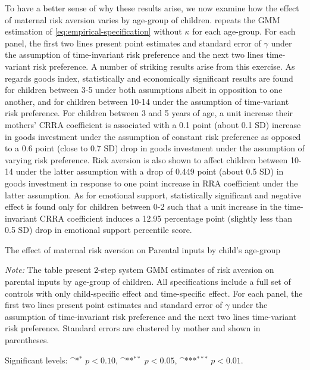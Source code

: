 \documentclass[emulatestandardclasses, 10pt, abstract = true]{scrartcl}
\begin{document}
To have a better sense of why these results arise, we now examine how the effect of maternal risk aversion varies by age-group of children.  repeats the GMM estimation of \eqref{eq:empirical-specification} without $\kappa$ for each age-group. For each panel, the first two lines present point estimates and standard error of $\gamma$ under the assumption of time-invariant risk preference and the next two lines time-variant risk preference. A number of striking results arise from this exercise. As regards goods index, statistically and economically significant results are found for children between 3-5 under both assumptions albeit in opposition to one another, and for children between 10-14 under the assumption of time-variant risk preference. For children between 3 and 5 years of age, a unit increase their mothers' CRRA coefficient is associated with a 0.1 point (about 0.1 SD) increase in goods investment under the assumption of constant risk preference as opposed to a 0.6 point (close to 0.7 SD) drop in goods investment under the assumption of varying risk preference. Risk aversion is also shown to affect children between 10-14 under the latter assumption with a drop of 0.449 point (about 0.5 SD) in goods investment in response to one point increase in RRA coefficient under the latter assumption. As for emotional support, statistically significant and negative effect is found only for children between 0-2 such that a unit increase in the time-invariant CRRA coefficient induces a 12.95 percentage point (slightly less than 0.5 SD) drop in emotional support percentile score.   

\begin{table}[!t]
	\centering
	\begin{threeparttable}
		\def\sym#1{\ifmmode^{#1}\else\(^{#1}\)\fi}
		\caption{The effect of maternal risk aversion on Parental inputs by child's age-group}	
		\setlength{\extrarowheight}{0.3em}
		
		\label{table:result-age}
		\begin{tablenotes}[flushleft] \footnotesize
			\item \textit{Note:} The table present 2-step system GMM estimates of risk aversion on parental inputs by age-group of children. All specifications include a full set of controls with only child-specific effect and time-specific effect. For each panel, the first two lines present point estimates and standard error of $\gamma$ under the assumption of time-invariant risk preference and the next two lines time-variant risk preference. Standard errors are clustered by mother and shown in parentheses. 
			\item Significant levels: \sym{*} \(p<0.10\), \sym{**} \(p<0.05\), \sym{***} \(p<0.01\).
		\end{tablenotes}
	\end{threeparttable}
\end{table}
\end{document}
